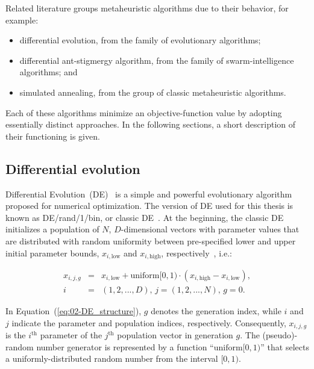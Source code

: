 \bigskip{}


Related literature groups metaheuristic algorithms due to their behavior,
for example:
\begin{itemize}
\item differential evolution, from the family of evolutionary algorithms;
\item differential ant-stigmergy algorithm, from the family of swarm-intelligence
algorithms; and
\item simulated annealing, from the group of classic metaheuristic algorithms. 
\end{itemize}
Each of these algorithms minimize an objective-function value by adopting
essentially distinct approaches. In the following sections, a short
description of their functioning is given.


\subsection{Differential evolution \label{sub:02-DE}}

Differential Evolution~(DE)~\cite{storn1997_Differential_evolution}
is a simple and powerful evolutionary algorithm proposed for numerical
optimization. The version of DE used for this thesis is known as DE/rand/1/bin,
or \textquotedbl{}classic DE\textquotedbl{}~\cite{Price-Differential_evolution_a_practical_approach:2005}.
At the beginning, the classic DE initializes a population of $N$,
$D$-dimensional vectors with parameter values that are distributed
with random uniformity between pre-specified lower and upper initial
parameter bounds, $x_{i,\mathrm{{low}}}$ and $x_{i,\mathrm{{high}}}$,
respectively~\cite{Ronkkonen-Real_parameter_optimization_with_differential_evolution:2005},
i.e.:

\begin{eqnarray}
x_{i,j,g} & = & x_{i,\mathrm{{low}}}+\mathrm{{uniform}[0,1)}\cdot(x_{i,\mathrm{{high}}}-x_{i,\mathrm{{low}}}),\nonumber \\
i & = & (1,2,...,D),\, j=(1,2,...,N),\, g=0.\label{eq:02-DE_structure}
\end{eqnarray}


\noindent In Equation~(\ref{eq:02-DE_structure}), $g$
denotes the generation index, while $i$ and $j$ indicate the parameter
and population indices, respectively. Consequently, $x_{i,j,g}$ is
the $i^{\mathrm{th}}$ parameter of the $j^{\mathrm{th}}$ population
vector in generation $g$. The (pseudo)-random number generator is
represented by a function ``$\mathrm{{uniform}[0,1)}$''\nomenclature[S]{$\mathrm{{uniform}[0,1)}$}{Function representing a uniformly-distributed random number from the interval [0,1)}
that selects a uniformly-distributed random number from the interval
$[0,1)$.

